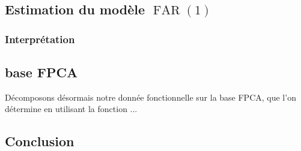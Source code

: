 \subsection{Estimation du modèle $\operatorname{FAR}(1)$}

\subsubsection{Interprétation}

\subsection{base FPCA}

Décomposons désormais notre donnée fonctionnelle sur la base FPCA, que l'on détermine en utilisant la fonction ...

\subsection{Conclusion}
